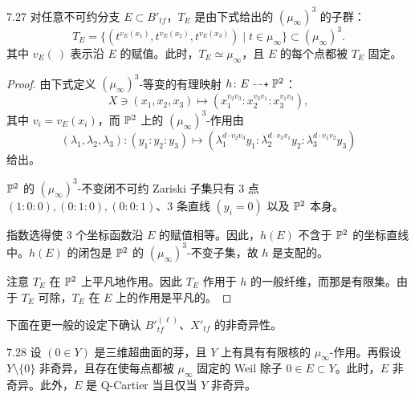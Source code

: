 \begin{lemmap}{7.27}
对任意不可约分支 $E\subset B'_{tf}$，$T_E$ 是由下式给出的 $(\mu_\infty)^3$ 的子群：
\[
T_E=\{(t^{v_E(x_1)},t^{v_E(x_2)},t^{v_E(x_3)})\mid t\in\mu_\infty\}\subset(\mu_\infty)^3.
\]
其中 $v_E(\ )$ 表示沿 $E$ 的赋值。此时，$T_E\simeq\mu_\infty$，且 $E$ 的每个点都被 $T_E$ 固定。
\end{lemmap}

\begin{proof}
由下式定义 $(\mu_\infty)^3$-等变的有理映射 $h\colon E\dashrightarrow\mathbb{P}^2$：
\[
X\ni(x_1,x_2,x_3)\mapsto(x_1^{v_2v_3}:x_2^{v_3v_1}:x_3^{v_1v_2}),
\]
其中 $v_i=v_E(x_i)$，而 $\mathbb{P}^2$ 上的 $(\mu_\infty)^3$-作用由
\[
(\lambda_1,\lambda_2,\lambda_3)\colon(y_1:y_2:y_3)\mapsto(\lambda_1^{d\cdot v_2v_3}y_1:\lambda_2^{d\cdot v_3v_1}y_2:\lambda_3^{d\cdot v_1v_2}y_3)
\]
给出。

$\mathbb{P}^2$ 的 $(\mu_\infty)^3$-不变闭不可约 Zariski 子集只有 3 点 $(1:0:0),(0:1:0),(0:0:1)$、3 条直线 $(y_i=0)$ 以及 $\mathbb{P}^2$ 本身。

指数选得使 3 个坐标函数沿 $E$ 的赋值相等。因此，$h(E)$ 不含于 $\mathbb{P}^2$ 的坐标直线中。$h(E)$ 的闭包是 $\mathbb{P}^2$ 的 $(\mu_\infty)^3$-不变子集，故 $h$ 是支配的。

注意 $T_E$ 在 $\mathbb{P}^2$ 上平凡地作用。因此 $T_E$ 作用于 $h$ 的一般纤维，而那是有限集。由于 $T_E$ 可除，$T_E$ 在 $E$ 上的作用是平凡的。
\end{proof}

下面在更一般的设定下确认 $B'^{(\ell)}_{tf}$、$X'_{tf}$ 的非奇异性。

\begin{lemmap}{7.28}
设 $(0\in Y)$ 是三维超曲面的芽，且 $Y$ 上有具有有限核的 $\mu_\infty$-作用。再假设 $Y\setminus\{0\}$ 非奇异，且存在使每点都被 $\mu_\infty$ 固定的 Weil 除子 $0\in E\subset Y$。此时，$E$ 非奇异。此外，$E$ 是 Q-Cartier 当且仅当 $Y$ 非奇异。
\end{lemmap}

